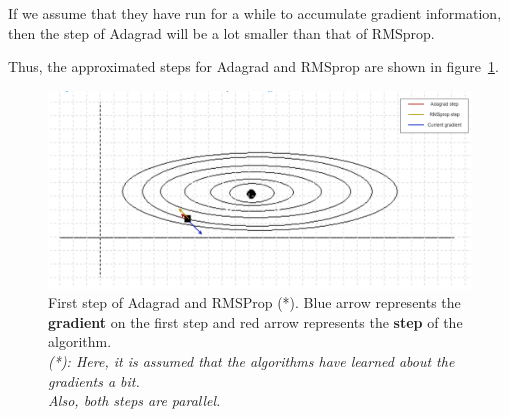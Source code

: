 If we assume that they have run for a while to accumulate gradient
information, then the step of Adagrad will be a lot smaller than that of RMSprop.

Thus, the approximated steps for Adagrad and RMSprop are shown in figure~\ref{fig:prob9_contour_adagrad_rmsprop}.

\begin{figure}[H]
	\centering
	\includegraphics[width=.7\textwidth]{../Problem 9/contour_adagrad_rmsprop.png}
	\caption{First step of Adagrad and RMSProp (*). Blue arrow represents the \textbf{gradient} on the first step and red arrow represents the \textbf{step} of the algorithm.\\
	\textit{\small(*): Here, it is assumed that the algorithms have learned about the gradients a bit.\\ Also, both steps are parallel.}
	}
	\label{fig:prob9_contour_adagrad_rmsprop}
\end{figure}